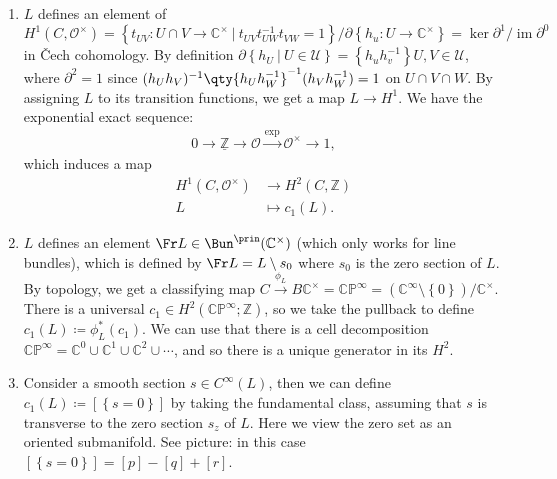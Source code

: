 \begin{remark}
\begin{enumerate}
\def\labelenumi{\arabic{enumi}.}
\item
  \(L\) defines an element of
  \(H^1(C, {\mathcal{O}}^{\times}) = \left\{{ t_{UV}: U \cap V \to {\mathbb{C}}^{\times}{~\mathrel{\Big|}~}t_{UV} t_{UW}^{-1}t_{VW} = 1 }\right\} / {{\partial}}\left\{{ h_u: U\to {\mathbb{C}}^{\times}}\right\} = \ker {{\partial}}^1 / \operatorname{im}{{\partial}}^0\)
  in Čech cohomology. By definition
  \({{\partial}}\left\{{ h_U {~\mathrel{\Big|}~}U\in \mathcal{U} }\right\} = \left\{{ h_u h_v^{-1}}\right\} U, V \in \mathcal{U}\),
  where \({{\partial}}^2 = 1\) since
  \((h_U h_V)^{-1}\qty{h_U h_W ^{-1}}^{-1}(h_V h_W ^{-1}) = 1\) on
  \(U \cap V \cap W\). By assigning \(L\) to its transition functions,
  we get a map \(L\to H^1\). We have the exponential exact sequence:
  \begin{align*}
    0 \to \underline{{\mathbb{Z}}} \to {\mathcal{O}}\xrightarrow{\exp} {\mathcal{O}}^{\times}\to 1
    ,\end{align*}
  which induces a map
  \begin{align*}
    H^1(C, {\mathcal{O}}^{\times}) &\to H^2(C, {\mathbb{Z}}) \\
    L &\mapsto c_1(L)
    .\end{align*}
\item
  \(L\) defines an element
  \(\Fr L \in \Bun^\prin({\mathbb{C}}^{\times})\) (which only works for
  line bundles), which is defined by \(\Fr L = L \setminus s_0\) where
  \(s_0\) is the zero section of \(L\). By topology, we get a
  classifying map
  \(C \xrightarrow{\phi_L} B{\mathbb{C}}^{\times}= {\mathbb{CP}}^\infty = ({\mathbb{C}}^{\infty} \setminus\left\{{0}\right\}) / {\mathbb{C}}^{\times}\).
  There is a universal
  \(c_1\in H^2({\mathbb{CP}}^{\infty}; {\mathbb{Z}})\), so we take the
  pullback to define \(c_1(L) \coloneqq\phi_L^*(c_1)\). We can use that
  there is a cell decomposition
  \({\mathbb{CP}}^{\infty } = {\mathbb{C}}^0 \cup{\mathbb{C}}^1 \cup{\mathbb{C}}^2 \cup\cdots\),
  and so there is a unique generator in its \(H^2\).
\item
  Consider a smooth section \(s\in C^{\infty }(L)\), then we can define
  \(c_1(L) \coloneqq[ \left\{{ s = 0 }\right\} ]\) by taking the
  fundamental class, assuming that \(s\) is transverse to the zero
  section \(s_z\) of \(L\). Here we view the zero set as an oriented
  submanifold. See picture: in this case
  \([\left\{{ s = 0 }\right\} ] = [p] - [q] + [r]\).
\end{enumerate}


\end{remark}


